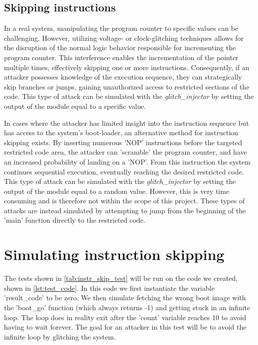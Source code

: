 \subsection{Skipping instructions}
\label{subsec:skip_instr}

In a real system, manipulating the program counter to specific values can be challenging. However, utilizing voltage- or clock-glitching techniques allows for the disruption of the normal logic behavior responsible for incrementing the program counter. This interference enables the incrementation of the pointer multiple times, effectively skipping one or more instructions. Consequently, if an attacker possesses knowledge of the execution sequence, they can strategically skip branches or jumps, gaining unauthorized access to restricted sections of the code. This type of attack can be simulated with the \textit{glitch\_injector} by setting the output of the module equal to a specific value. 

In cases where the attacker has limited insight into the instruction sequence but has access to the system's boot-loader, an alternative method for instruction skipping exists. By inserting numerous 'NOP' instructions before the targeted restricted code area, the attacker can 'scramble' the program counter, and have an increased probability of landing on a 'NOP'. From this instruction the system continues sequential execution, eventually reaching the desired restricted code. This type of attack can be simulated with the \textit{glitch\_injector} by setting the output of the module equal to a random value. However, this is very time consuming and is therefore not within the scope of this project. These types of attacks are instead simulated by attempting to jump from the beginning of the 'main' function directly to the restricted code. 

\section{Simulating instruction skipping}
\label{sec:sim_instr_skip}

The tests shown in \autoref{tab:instr_skip_test} will be run on the code we created, shown in \autoref{lst:test_code}. In this code we first instantiate the variable 'result\_code' to be zero. We then simulate fetching the wrong boot image with the 'boot\_go' function (which always returns -1) and getting stuck in an infinite loop. The loop does in reality exit after the 'count' variable reaches 10 to avoid having to wait forever. The goal for an attacker in this test will be to avoid the infinite loop by glitching the system. 

